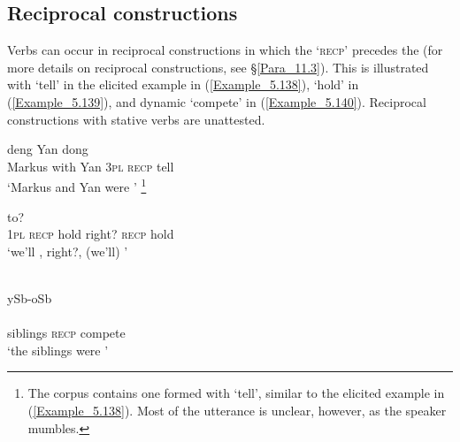 \subsection{Reciprocal constructions}
\label{Para_5.3.8}
Verbs can occur in reciprocal constructions in which the   ‘\textsc{recp}’ precedes the  (for more details on reciprocal constructions, see §\ref{Para_11.3}). This is illustrated with   ‘tell’ in the elicited example in (\ref{Example_5.138}),   ‘hold’ in (\ref{Example_5.139}), and  dynamic  ‘compete’ in (\ref{Example_5.140}). Reciprocal constructions with  stative verbs are unattested.

\largerpage

\ea
\label{Example_5.138}
 {deng} {Yan} {dong} {} {}\\ %
 Markus  with  Yan  \textsc{3pl}  \textsc{recp}  tell\\
\glt 
‘Markus and Yan were ’ \textstyleExampleSource{[Elicited BR130601.001]}\footnote{The corpus contains one  formed with   ‘tell’, similar to the elicited example in (\ref{Example_5.138}). Most of the utterance is unclear, however, as the speaker mumbles.}
\z

\ea
\label{Example_5.139}
 {} {} {to?}  \\ %
 \textsc{1pl}  \textsc{recp}  hold  right?  \textsc{recp}  hold\\
\glt 
‘we’ll , right?, (we’ll) ’ \textstyleExampleSource{[080922-001a-CvPh.0695]}
\z

\ea
\label{Example_5.140}
 {} {}\\ %
 ySb-oSb    \\
 \\
 siblings  \textsc{recp}  compete\\
\glt 
‘the siblings were ’ \textstyleExampleSource{[080919-006-CvNP.0001]}
\z





